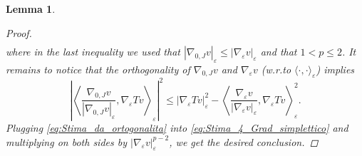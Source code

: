\documentclass[10pt]{amsart}
\numberwithin{equation}{section}
\newtheorem{lemma}[theorem]{Lemma}
\theoremstyle{definition}
\begin{document}
\begin{lemma}
\begin{proof}
\begin{equation}
\begin{aligned}
			\end{aligned}
		\end{equation}
		\noindent where in the last inequality we used that $|\nabla_{0,J}v|_{\varepsilon} \leq |\nabla_{\varepsilon}v|_{\varepsilon}$ and that $1<p\leq 2$.
		It remains to notice that the orthogonality of $\nabla_{0,J}v$ and $\nabla_{\varepsilon}v$ (w.r.to $\langle \cdot,\cdot\rangle_{\varepsilon}$) implies
		\begin{equation}\label{eq:Stima_da_ortogonalita}
			\left|\left\langle \dfrac{\nabla_{0,J}v}{|\nabla_{0,J}v|_{\varepsilon}}, \nabla_{\varepsilon}T v \right\rangle_{\varepsilon}\right|^2 \leq |\nabla_{\varepsilon}T v|_{\varepsilon}^{2} - \left\langle\dfrac{\nabla_{\varepsilon}v}{|\nabla_{\varepsilon}v|_{\varepsilon}}, \nabla_{\varepsilon}T v\right\rangle_{\varepsilon}^2.
		\end{equation}
		Plugging \eqref{eq:Stima_da_ortogonalita} into \eqref{eq:Stima_4_Grad_simplettico} and multiplying on both sides by $|\nabla_{\varepsilon}v|_{\varepsilon}^{p-2}$, we get the desired conclusion.	 	
	\end{proof}
\end{lemma}
\end{document}
